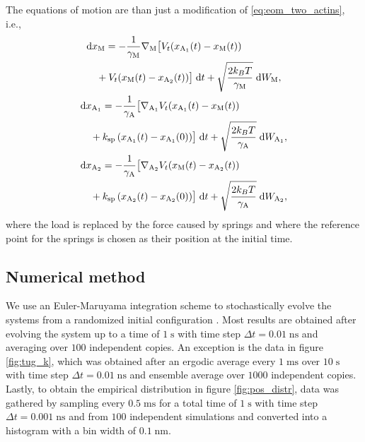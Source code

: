 \documentclass[aps,pre,twocolumn,showpacs,showkeys,superscriptaddress,floatfix]{revtex4-1}
\newcommand{\rmd}{{\mathrm d}}
\begin{document}
The equations of motion are than just a modification of \eqref{eq:eom_two_actins}, i.e.,   
\begin{equation}
\begin{gathered}
\begin{multlined}[b][.45\textwidth]
\rmd x_\text{M} = 
- \frac{1}{\gamma_\text{M}} \nabla_\text{M} \bigl[ 
V_t(x_{\text{A}_1}(t) - x_\text{M}(t)) 
\\
+ V_t(x_\text{M}(t) - x_{\text{A}_2}(t)) 
\bigr] \; \rmd t 
+ \sqrt{ \frac{2 k_B T}{\gamma_\text{M}} } \; \rmd W_\text{M} ,
\end{multlined}\\
\begin{multlined}[b][.45\textwidth]
\rmd x_{\text{A}_1} = 
- \frac{1}{\gamma_\text{A}} \bigl[ \nabla_{\text{A}_1} V_t( x_{\text{A}_1}(t) - x_\text{M}(t) ) 
\\
+ k_\text{sp} \left( x_{\text{A}_1}(t) - x_{\text{A}_1}(0) \right) \bigr] \; \rmd t 
+ \sqrt{ \frac{2 k_B T}{\gamma_\text{A}} } \; \rmd W_{\text{A}_1} ,
\end{multlined}\\
\begin{multlined}[b][.45\textwidth]
\rmd x_{\text{A}_2} = 
- \frac{1}{\gamma_\text{A}} \bigl[ \nabla_{\text{A}_2} V_t( x_\text{M}(t) - x_{\text{A}_2}(t) )
\\
+ k_\text{sp} \left( x_{\text{A}_2}(t) - x_{\text{A}_2}(0) \right) \bigr] \; \rmd t 
+ \sqrt{ \frac{2 k_B T}{\gamma_\text{A}} } \; \rmd W_{\text{A}_2} ,
\end{multlined}
\end{gathered}
\label{eq:eom_two_actins_no_load}
\end{equation}
where the load is replaced by the force caused by springs and where the reference point for the springs is chosen as their position at the initial time. 

\subsection{Numerical method}
We use an Euler-Maruyama integration scheme to stochastically evolve the systems from a randomized initial configuration \cite{kloeden1989survey,maruyama1955continuous}. 
Most results are obtained after evolving the system up to a time of $1\;\mathrm{s}$ with time step $\Delta t = 0.01\;\mathrm{ns}$ and averaging over $100$ independent copies.    
An exception is the data in figure \ref{fig:tug_k}, 
which was obtained after an ergodic average every $1\;\mathrm{ms}$ over $10\;\mathrm{s}$ with time step $\Delta t = 0.01\;\mathrm{ns}$ and ensemble average over $1000$ independent copies.
Lastly, to obtain the empirical distribution in figure \ref{fig:pos_distr}, 
data was gathered by sampling every $0.5\;\mathrm{ms}$ for a total time of $1\;\mathrm{s}$ with time step $\Delta t = 0.001\;\mathrm{ns}$ and from $100$ independent simulations and converted into a histogram with a bin width of $0.1\;\mathrm{nm}$.
\end{document}

